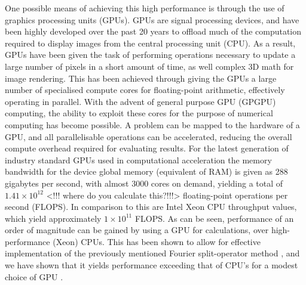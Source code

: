 One possible means of achieving this high performance is through the use of graphics processing units (GPUs). GPUs are signal processing devices, and have been highly developed over the past 20 years to offload much of the computation required to display images from the central processing unit (CPU). As a result, GPUs have been given the task of performing operations necessary to update a large number of pixels in a short amount of time, as well complex 3D math for image rendering. This has been achieved through giving the GPUs a large number of specialised compute cores for floating-point arithmetic, effectively operating in parallel. With the advent of general purpose GPU (GPGPU) computing, the ability to exploit these cores for the purpose of numerical computing has become possible. A problem can be mapped to the hardware of a GPU, and all parallelisable operations can be accelerated, reducing the overall compute overhead required for evaluating results. For the latest generation of industry standard GPUs used in computational acceleration the memory bandwidth for the device global memory (equivalent of RAM) is given as 288 gigabytes per second, with almost 3000 cores on demand, yielding a total of $1.41\times10^{12}$ <!!! where do you calculate this?!!!> floating-point operations per second (FLOPS). In comparison to this are Intel Xeon CPU throughput values, which yield approximately $1\times10^{11}$ FLOPS. As can be seen, performance of an order of magnitude can be gained by using a GPU for calculations, over high-performance (Xeon) CPUs. This has been shown to allow for effective implementation of the previously mentioned Fourier split-operator method \cite{Num:Bauke_cpc_2011}, and we have shown that it yields performance exceeding that of CPU's for a modest choice of GPU \cite{AO:Morgan_ORiordan_pra_2013}.
